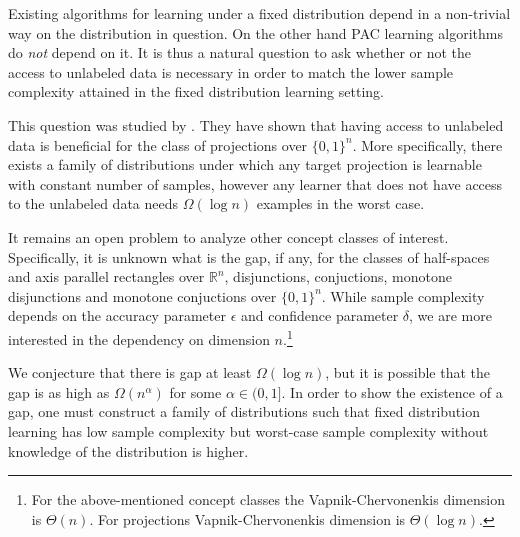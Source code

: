 \documentclass[12pt]{colt2019}
\newcommand{\R}{\mathbb{R}}
\begin{document}

Existing algorithms for learning under a fixed distribution depend in a
non-trivial way on the distribution in question. On the other hand PAC learning
algorithms do \emph{not} depend on it. It is thus a natural question to ask
whether or not the access to unlabeled data is necessary in order to match the
lower sample complexity attained in the fixed distribution learning setting.

This question was studied by \cite{Darnstadt-Simon-Szorenyi-2013, gps19}. They have shown that having access to
unlabeled data is beneficial for the class of projections over $\{0,1\}^n$. More
specifically, there exists a family of distributions under which any target
projection is learnable with constant number of samples, however any learner
that does not have access to the unlabeled data needs $\Omega(\log n)$ examples
in the worst case.

It remains an open problem to analyze other concept classes of interest.
Specifically, it is unknown what is the gap, if any, for the classes of
half-spaces and axis parallel rectangles over $\R^n$, disjunctions, conjuctions,
monotone disjunctions and monotone conjuctions over $\{0,1\}^n$. While sample
complexity depends on the accuracy parameter $\epsilon$ and confidence parameter
$\delta$, we are more interested in the dependency on dimension
$n$.\footnote{For the above-mentioned concept classes the Vapnik-Chervonenkis
dimension is $\Theta(n)$. For projections Vapnik-Chervonenkis dimension is
$\Theta(\log n)$.}

We conjecture that there is gap at least $\Omega(\log n)$, but it is possible
that the gap is as high as $\Omega(n^\alpha)$ for some $\alpha \in (0,1]$. In
order to show the existence of a gap, one must construct a family of
distributions such that fixed distribution learning has low sample complexity
but worst-case sample complexity without knowledge of the distribution is
higher.


\end{document}

